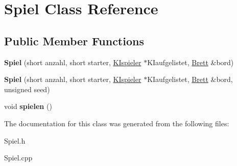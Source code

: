 \hypertarget{class_spiel}{\section{Spiel Class Reference}
\label{class_spiel}
}
\subsection*{Public Member Functions}
\begin{DoxyCompactItemize}
\item 
\hypertarget{class_spiel_ad898b063393cbfa9756dd3282ded2593}{{\bfseries Spiel} (short anzahl, short starter, \hyperlink{class_k_ispieler}{K\-Ispieler} $\ast$K\-Iaufgelistet, \hyperlink{class_brett}{Brett} \&bord)}\label{class_spiel_ad898b063393cbfa9756dd3282ded2593}

\item 
\hypertarget{class_spiel_a563e38159c5eeb7c7786d0c5d9ef3da6}{{\bfseries Spiel} (short anzahl, short starter, \hyperlink{class_k_ispieler}{K\-Ispieler} $\ast$K\-Iaufgelistet, \hyperlink{class_brett}{Brett} \&bord, unsigned seed)}\label{class_spiel_a563e38159c5eeb7c7786d0c5d9ef3da6}

\item 
\hypertarget{class_spiel_ab7b25dfd3aebf26022341df1c855fd57}{void {\bfseries spielen} ()}\label{class_spiel_ab7b25dfd3aebf26022341df1c855fd57}

\end{DoxyCompactItemize}


The documentation for this class was generated from the following files\-:\begin{DoxyCompactItemize}
\item 
Spiel.\-h\item 
Spiel.\-cpp\end{DoxyCompactItemize}
